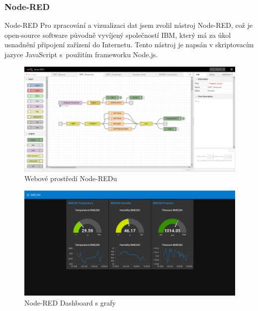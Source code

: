 \documentclass[11pt]{beamer}
\begin{document}
\subsubsection{Node-RED}

\begin{frame}{Node-RED}
  Pro zpracování a vizualizaci dat jsem zvolil nástroj Node-RED, což je open-source software původně vyvíjený společností IBM, který má za úkol usnadnění připojení zařízení do Internetu. Tento nástroj je napsán v skriptovacím jazyce JavaScript s~použitím frameworku Node.js.
  \begin{center}
      \begin{figure}
        \includegraphics[width = \textwidth]{../img/node-red.png}
        \caption{Webové prostředí Node-REDu}
      \end{figure}
    \endminipage
      \begin{figure}
        \includegraphics[width = \textwidth]{../img/node-red_dashboard.png}
        \caption{Node-RED Dashboard s grafy}
      \end{figure}
    \endminipage
  \end{center}
\end{frame}
\end{document}
